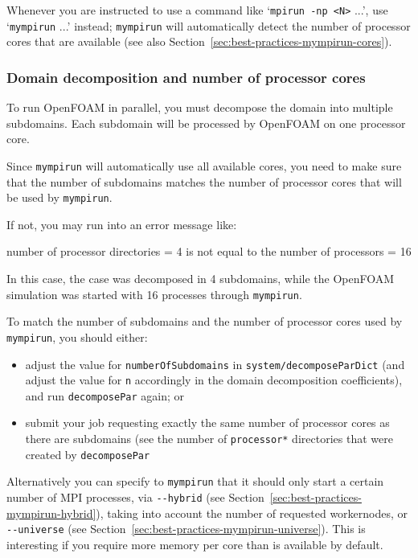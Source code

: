 {Whenever you are instructed to use a command like `\texttt{\small{mpirun -np <N>}} ...',
use `\texttt{\small{mympirun}} ...' instead; \texttt{\small{mympirun}} will automatically detect the number of
processor cores that are available (see also Section~\ref{sec:best-practices-mympirun-cores}).


\subsubsection{Domain decomposition and number of processor cores}
\label{sec:best-practices-openfoam-domain-decomposition-processor-cores}

To run OpenFOAM in parallel, you must decompose the domain into multiple subdomains.
Each subdomain will be processed by OpenFOAM on one processor core.

Since {\small\texttt{mympirun}} will automatically use all available cores, you need to make sure
that the number of subdomains matches the number of processor cores that will be used by {\small\texttt{mympirun}}.

If not, you may run into an error message like:

\begin{prompt}
number of processor directories = 4 is not equal to the number of processors = 16
\end{prompt}

In this case, the case was decomposed in 4 subdomains, while the OpenFOAM simulation was started with 16 processes
through {\small\texttt{mympirun}}.

To match the number of subdomains and the number of processor cores used by {\small\texttt{mympirun}}, 
you should either:

\begin{itemize}
\item adjust the value for {\small\texttt{numberOfSubdomains}} in {\small\texttt{system/decomposeParDict}}
(and adjust the value for {\small\texttt{n}} accordingly in the domain decomposition coefficients),
and run {\small\texttt{decomposePar}} again; or
\item submit your job requesting exactly the same number of processor cores as there are subdomains (see the
number of {\small\texttt{processor*}} directories that were created by {\small\texttt{decomposePar}}
\end{itemize}

Alternatively you can specify to \texttt{mympirun} that it should only start a certain number of MPI processes,
via {\small\texttt{-{}-hybrid}} (see Section~\ref{sec:best-practices-mympirun-hybrid}),
taking into account the number of requested workernodes,
or {\small\texttt{-{}-universe}} (see Section~\ref{sec:best-practices-mympirun-universe}).
This is interesting if you require more memory per core than is available by default.


}
